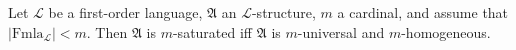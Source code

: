 Let $\mathcal{L}$ be a first-order language, $\mathfrak{A}$ an $\mathcal{L}$-structure, $m$ a cardinal, and assume that $|\text{Fmla}_{\mathcal{L}}| < m$. Then $\mathfrak{A}$ is $m$-saturated iff $\mathfrak{A}$ is $m$-universal and $m$-homogeneous.
